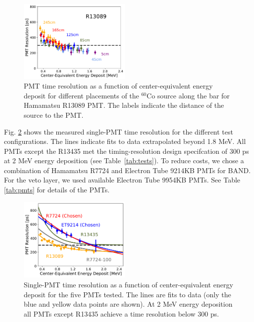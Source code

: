 \documentclass[3p,final,twocolumn]{elsarticle}
\begin{document}
\begin{figure}[tb]
	\centering
		\includegraphics[width=0.48\textwidth]{pos-dep.pdf}
		\caption{PMT time resolution as a function of
                  center-equivalent energy deposit for different
                  placements of the $^{60}$Co source along the bar for
                  Hamamatsu R13089 PMT. The labels indicate the
                  distance of the source to the PMT. }
	\label{fig:test_stand_posdep}
\end{figure}

Fig. \ref{fig:test_stand_results} shows the measured single-PMT time
resolution for the different test configurations.  The lines indicate fits
to data extrapolated beyond 1.8 \si{\mega\electronvolt}.  
All PMTs except the R13435 met the timing-resolution design specifcation of 300 \si{\pico\s} at 2
\si{\mega\electronvolt} energy deposition (see 
Table~\ref{tab:tests}).  To reduce costs, we chose a combination of
Hamamatsu R7724 \cite{pmtR7724} and Electron Tube 9214KB
\cite{pmt9214} PMTs for BAND. For the veto layer, we used 
available Electron Tube 9954KB PMTs. See Table \ref{tab:pmts} for
details of the PMTs.

\begin{figure}[tb]
	\centering
		\includegraphics[width=0.48\textwidth]{all-lines-somedata.pdf}
		\caption{Single-PMT time resolution as a function of center-equivalent energy deposit for the five PMTs
                  tested. The lines are fits to data (only the blue  and yellow data points are shown). At 2
                  \si{\mega\electronvolt} energy deposition all PMTs except R13435 achieve a time resolution below 300 \si{\pico\s}.}
          	\label{fig:test_stand_results}
\end{figure}
\end{document}
